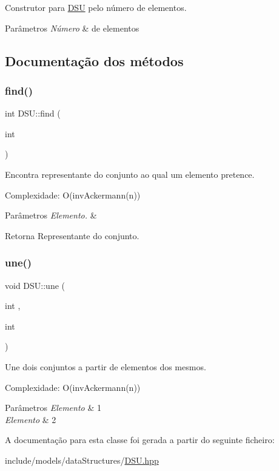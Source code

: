 Construtor para \mbox{\hyperlink{classDSU}{D\+SU}} pelo número de elementos. 
\begin{DoxyParams}{Parâmetros}
{\em Número} & de elementos \\
\hline
\end{DoxyParams}


\subsection{Documentação dos métodos}
\mbox{\label{classDSU_a3915dd627bd9cd0abc6f83e154944961}} 
\subsubsection{\texorpdfstring{find()}{find()}}
{\footnotesize\ttfamily int D\+S\+U\+::find (\begin{DoxyParamCaption}\item[{int}]{ }\end{DoxyParamCaption})}

Encontra representante do conjunto ao qual um elemento pretence.

Complexidade\+: O(inv\+Ackermann(n)) 
\begin{DoxyParams}{Parâmetros}
{\em Elemento.} & \\
\hline
\end{DoxyParams}
\begin{DoxyReturn}{Retorna}
Representante do conjunto. 
\end{DoxyReturn}
\mbox{\label{classDSU_a69728d8ed8c2262f76320ca7238e2f1f}} 
\subsubsection{\texorpdfstring{une()}{une()}}
{\footnotesize\ttfamily void D\+S\+U\+::une (\begin{DoxyParamCaption}\item[{int}]{,  }\item[{int}]{ }\end{DoxyParamCaption})}

Une dois conjuntos a partir de elementos dos mesmos.

Complexidade\+: O(inv\+Ackermann(n)) 
\begin{DoxyParams}{Parâmetros}
{\em Elemento} & 1 \\
\hline
{\em Elemento} & 2 \\
\hline
\end{DoxyParams}


A documentação para esta classe foi gerada a partir do seguinte ficheiro\+:\begin{DoxyCompactItemize}
\item 
include/models/data\+Structures/\mbox{\hyperlink{DSU_8hpp}{D\+S\+U.\+hpp}}\end{DoxyCompactItemize}
